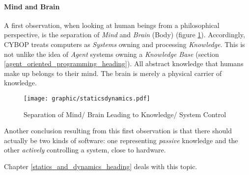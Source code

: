 %
%
%
%
%
%
%

\paragraph{Mind and Brain}
\label{mind_and_brain_heading}

A first observation, when looking at human beings from a philosophical
perspective, is the separation of \emph{Mind} and \emph{Brain} (Body) (figure
\ref{staticsdynamics_figure}). Accordingly, CYBOP treats computers as
\emph{Systems} owning and processing \emph{Knowledge}. This is not unlike the
idea of \emph{Agent} systems owning a \emph{Knowledge Base} (section
\ref{agent_oriented_programming_heading}). All abstract knowledge that humans
make up belongs to their mind. The brain is merely a physical carrier of
knowledge.

\begin{figure}[ht]
    \begin{center}
        \texttt{[image: graphic/staticsdynamics.pdf]}
        \caption{Separation of Mind/ Brain Leading to Knowledge/ System Control}
        \label{staticsdynamics_figure}
    \end{center}
\end{figure}

Another conclusion resulting from this first observation is that there should
actually be two kinds of software: one representing \emph{passive} knowledge
and the other \emph{actively} controlling a system, close to hardware.

Chapter \ref{statics_and_dynamics_heading} deals with this topic.
